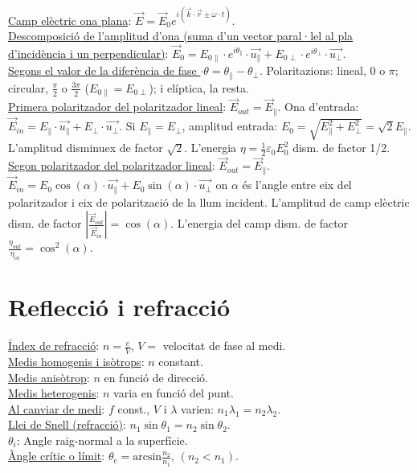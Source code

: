 \documentclass[10pt]{article}
\begin{document}
\begin{multicols}{4}
\ul{Camp el\`ectric ona plana}: $\vec{E} = \vec{E}_0 e^{i\left( \vec{k}\cdot\vec{r} \pm \omega\cdot t \right)}$.\\
\ul{Descomposició de l'amplitud d'ona (suma d'un vector paral·lel al pla d'incidència i un perpendicular)}: $\vec{E}_0 = E_{0\parallel} \cdot e^{i\theta_{\parallel}}\cdot \vec{u_{\parallel}} + E_{0\perp} \cdot e^{i\theta_{\perp}} \cdot \vec{u_{\perp}} $.\\
\ul{Segons el valor de la diferència de fase $·\theta = \theta_{\parallel} - \theta_{\perp}$}. Polaritazions: lineal, 0 o $\pi$; circular, $\frac{\pi}{2}$ o $\frac{3\pi}{2}$ ($E_{0\parallel} = E_{0\perp}$); i elíptica, la resta.\\
\ul{Primera polaritzador del polaritzador lineal}: $\vec{E}_{out} = \vec{E}_{\parallel}$. Ona d'entrada: $\vec{E}_{in} = E_{\parallel} \cdot \vec{u_{\parallel}} + E_{\perp}\cdot \vec{u_{\perp}}$. Si $E_{\parallel} = E_{\perp}$, amplitud entrada: $E_{0} = \sqrt{E_{\parallel}^{2} + E_{\perp}^{2}} = \sqrt{2}E_{\parallel}$. L'amplitud disminuex de factor $\sqrt{2}$. L'energia $\eta = \frac{1}{2} \varepsilon_0 E_{0}^{2}$ dism. de factor 1/2.\\
\ul{Segon polaritzador del polaritzador lineal}: $\vec{E}_{out} = \vec{E}_{\parallel}$. $\vec{E}_{in} = E_{0}\cos(\alpha) \cdot \vec{u_{\parallel}} + E_{0}\sin(\alpha)\cdot \vec{u_{\perp}}$ on $\alpha$ és l'angle entre eix del polaritzador i eix de polarització de la llum incident. L'amplitud de camp elèctric dism. de factor $\left|\frac{\vec{E}_{out}}{\vec{E}_{in}}\right| = \cos(\alpha)$. L'energia del camp dism. de factor $\frac{\eta_{out}}{\eta_{in}} = \cos^2(\alpha)$.
\section{Reflecci\'o i refracci\'o}

\ul{\'Index de refracci\'o}: $n = \frac{c}{V}$, $V =$ velocitat de fase al medi. \\
\ul{Medis homogenis i is\`otrops}: $n$ constant. \\
\ul{Medis anis\`otrop}: $n$ en funci\'o de direcci\'o. \\
\ul{Medis heterogenis}: $n$ varia en funci\'o del punt. \\
\ul{Al canviar de medi}: $f$ const., $V$ i $\lambda$ varien: $n_1 \lambda_1= n_2 \lambda_2$. \\
\ul{Llei de Snell (refracci\'o)}: $n_1\sin\theta_1 = n_2\sin\theta_2$. \\
\ul{$\theta_i$}: Angle raig-normal a la superf\'icie. \\
\ul{\`Angle cr\'itic o l\'imit}: $\theta_{\text{c}} = \text{arcsin} \frac{n_2}{n_1}, \, (n_2 < n_1).$


\end{multicols}
\end{document}
